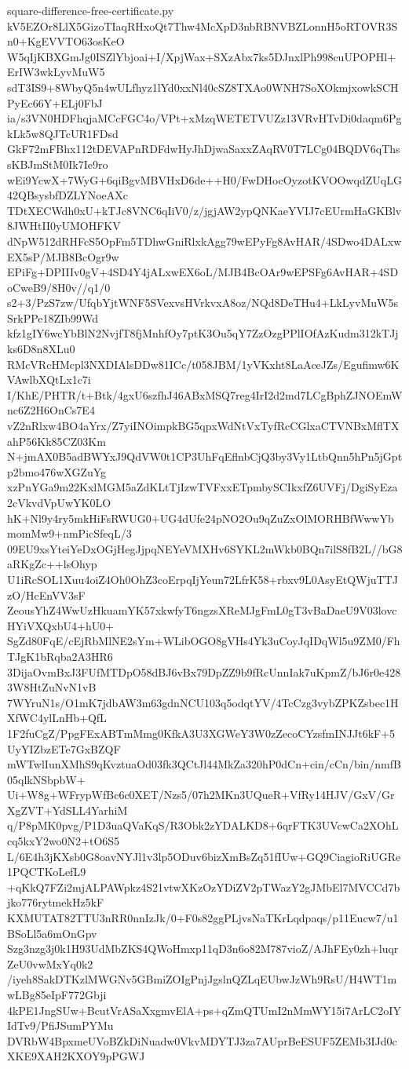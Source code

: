 \documentclass[11pt]{article}
\theoremstyle{definition}
\theoremstyle{remark}
\begin{document}
\begin{filecontents*}[overwrite]{square-difference-free-certificate.py}
kV5EZOr8LlX5GizoTIaqRHxoQt7Thw4McXpD3nbRBNVBZLonnH5oRTOVR3Sn0+KgEVVTO63osKeO
W5qIjKBXGmJg0ISZlYbjoai+I/XpjWax+SXzAbx7ks5DJnxlPh998cuUPOPHl+ErIW3wkLyvMuW5
sdT3IS9+8WbyQ5n4wULfhyz1lYd0xxNl40cSZ8TXAo0WNH7SoXOkmjxowkSCHPyEc66Y+ELj0FbJ
ia/s3VN0HDFhqjaMCcFGC4o/VPt+xMzqWETETVUZz13VRvHTvDi0daqm6PgkLk5w8QJTcUR1FDsd
GkF72mFBhx112tDEVAPnRDFdwHyJhDjwaSaxxZAqRV0T7LCg04BQDV6qThssKBJmStM0Ik7Ie9ro
wEi9YcwX+7WyG+6qiBgvMBVHxD6de++H0/FwDHocOyzotKVOOwqdZUqLG42QBsysbfDZLYNoeAXc
TDtXECWdh0xU+kTJc8VNC6qIiV0/z/jgjAW2ypQNKaeYVIJ7cEUrmHaGKBlv8JWHtII0yUMOHFKV
dNpW512dRHFcS5OpFm5TDhwGniRlxkAgg79wEPyFg8AvHAR/4SDwo4DALxwEX5sP/MJB8BcOgr9w
EPiFg+DPIIIv0gV+4SD4Y4jALxwEX6oL/MJB4BcOAr9wEPSFg6AvHAR+4SDoCweB9/8H0v//q1/0
s2+3/PzS7zw/UfqbYjtWNF5SVexvsHVrkvxA8oz/NQd8DeTHu4+LkLyvMuW5sSrkPPe18ZIb99Wd
kfz1gIY6wcYbBlN2NvjfT8fjMnhfOy7ptK3Ou5qY7ZzOzgPPlIOfAzKudm312kTJjks6D8n8XLu0
RMcVRcHMcpl3NXDIAlsDDw81ICc/t058JBM/1yVKxht8LaAceJZs/Egufimw6KVAwlbXQtLx1c7i
I/KhE/PHTR/t+Btk/4gxU6szfhJ46ABxMSQ7reg4IrI2d2md7LCgBphZJNOEmWnc6Z2H6OnCs7E4
vZ2nRlxw4BO4aYrx/Z7yiINOimpkBG5qpxWdNtVxTyfRcCGlxaCTVNBxMflTXahP56Kk85CZ03Km
N+jmAX0B5adBWYxJ9QdVW0t1CP3UhFqEflnbCjQ3by3Vy1LtbQnn5hPn5jGptp2bmo476wXGZuYg
xzPnYGa9m22KxlMGM5aZdKLtTjIzwTVFxxETpmbySCIkxfZ6UVFj/DgiSyEza2cVkvdVpUwYK0LO
hK+Nl9y4ry5mkHiFsRWUG0+UG4dUfe24pNO2Ou9qZuZxOlMORHBfWwwYbmomMw9+nmPicSfeqL/3
09EU9xsYteiYeDxOGjHegJjpqNEYeVMXHv6SYKL2mWkb0BQn7ilS8fB2L//bG8aRKgZc++lsOhyp
U1iRcSOL1Xuu4oiZ4Oh0OhZ3coErpqIjYeun72LfrK58+rbxv9L0AsyEtQWjuTTJzO/HcEnVV3sF
ZeousYhZ4WwUzHkuamYK57xkwfyT6ngzsXReMJgFmL0gT3vBaDaeU9V03lovcHYiVXQxbU4+hU0+
SgZd80FqE/cEjRbMlNE2sYm+WLibOGO8gVHs4Yk3uCoyJqIDqWl5u9ZM0/FhTJgK1bRqba2A3HR6
3DijaOvmBxJ3FUfMTDpO58dBJ6vBx79DpZZ9b9fRcUnnIak7uKpmZ/bJ6r0e4283W8HtZuNvN1vB
7WYruN1s/O1mK7jdbAW3m63gdnNCU103q5odqtYV/4TcCzg3vybZPKZsbec1HXfWC4ylLnHb+QfL
1F2fuCgZ/PpgFExABTmMmg0KfkA3U3XGWeY3W0zZecoCYzsfmINJJt6kF+5UyYIZbzETe7GxBZQF
mWTwlIunXMhS9qKvztuaOd03fk3QCtJl44MkZa320hP0dCn+cin/cCn/bin/nmfB05qlkNSbpbW+
Ui+W8g+WFrypWfBc6c0XET/Nzs5/07h2MKn3UQueR+VfRy14HJV/GxV/GrXgZVT+YdSLL4YarhiM
q/P8pMK0pvg/P1D3uaQVaKqS/R3Obk2zYDALKD8+6qrFTK3UVcwCa2XOhLcq5kxY2wo0N2+tO6S5
L/6E4h3jKXsb0G8oavNYJl1v3lp5ODuv6bizXmBsZq51fIUw+GQ9CiagioRiUGRe1PQCTKoLefL9
+qKkQ7FZi2mjALPAWpkz4S21vtwXKzOzYDiZV2pTWazY2gJMbEl7MVCCd7bjko776rytmekHz5kF
KXMUTAT82TTU3nRR0nnIzJk/0+F0s82ggPLjvsNaTKrLqdpaqs/p11Eucw7/u1BSoLl5a6mOnGpv
Szg3nzg3j0k1H93UdMbZKS4QWoHmxp11qD3n6o82M787vioZ/AJhFEy0zh+luqrZeU0vwMxYq0k2
/iyeh8SakDTKzlMWGNv5GBmiZOIgPnjJgslnQZLqEUbwJzWh9RsU/H4WT1mwLBg85eIpF772Gbji
4kPE1JngSUw+BcutVrASaXxgmvElA+ps+qZmQTUmI2nMmWY15i7ArLC2oIYIdTv9/PfiJSumPYMu
DVRbW4BpxmeUVoBZkDiNuadw0VkvMDYTJ3za7AUprBeESUF5ZEMb3IJd0cXKE9XAH2KXOY9pPGWJ

\end{filecontents*}
\end{document}
